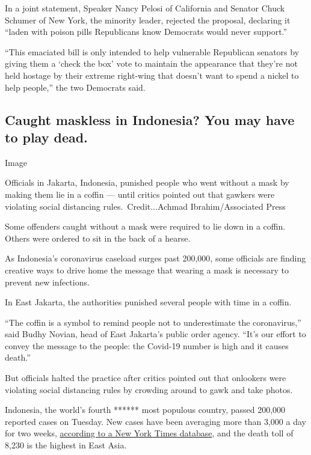In a joint statement, Speaker Nancy Pelosi of California and Senator
Chuck Schumer of New York, the minority leader, rejected the proposal,
declaring it ``laden with poison pills Republicans know Democrats would
never support.''

``This emaciated bill is only intended to help vulnerable Republican
senators by giving them a `check the box' vote to maintain the
appearance that they're not held hostage by their extreme right-wing
that doesn't want to spend a nickel to help people,'' the two Democrats
said.

\hypertarget{caught-maskless-in-indonesia-you-may-have-to-play-dead}{%
\subsection{Caught maskless in Indonesia? You may have to play
dead.}\label{caught-maskless-in-indonesia-you-may-have-to-play-dead}}

Image

Officials in Jakarta, Indonesia, punished people who went without a mask
by making them lie in a coffin --- until critics pointed out that
gawkers were violating social distancing rules.~Credit...Achmad
Ibrahim/Associated Press

Some offenders caught without a mask were required to lie down in a
coffin. Others were ordered to sit in the back of a hearse.

As Indonesia's coronavirus caseload surges past 200,000, some officials
are finding creative ways to drive home the message that wearing a mask
is necessary to prevent new infections.

In East Jakarta, the authorities punished several people with time in a
coffin.

``The coffin is a symbol to remind people not to underestimate the
coronavirus,'' said Budhy Novian, head of East Jakarta's public order
agency. ``It's our effort to convey the message to the people: the
Covid-19 number is high and it causes death.''

But officials halted the practice after critics pointed out that
onlookers were violating social distancing rules by crowding around to
gawk and take photos.

Indonesia, the world's fourth ****** most populous country, passed
200,000 reported cases on Tuesday. New cases have been averaging more
than 3,000 a day for two weeks,
\href{https://www.nytimes3xbfgragh.onion/interactive/2020/world/coronavirus-maps.html\#countries}{according
to a New York Times database}, and the death toll of 8,230 is the
highest in East Asia.

